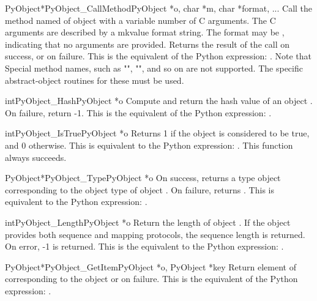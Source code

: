 \documentclass[twoside]{report}
\begin{document}
\begin{cfuncdesc}{PyObject*}{PyObject_CallMethod}{PyObject *o, char *m, char *format, ...}
Call the method named  of object  with a variable number of
C arguments.  The C arguments are described by a mkvalue
format string.  The format may be \NULL{}, indicating that no
arguments are provided. Returns the result of the call on
success, or \NULL{} on failure.  This is the equivalent of the
Python expression: .
Note that Special method names, such as "",
"", and so on are not supported. The specific
abstract-object routines for these must be used.
\end{cfuncdesc}


\begin{cfuncdesc}{int}{PyObject_Hash}{PyObject *o}
Compute and return the hash value of an object .  On
failure, return -1.  This is the equivalent of the Python
expression: .
\end{cfuncdesc}


\begin{cfuncdesc}{int}{PyObject_IsTrue}{PyObject *o}
Returns 1 if the object  is considered to be true, and
0 otherwise. This is equivalent to the Python expression:
.
This function always succeeds.
\end{cfuncdesc}


\begin{cfuncdesc}{PyObject*}{PyObject_Type}{PyObject *o}
On success, returns a type object corresponding to the object
type of object . On failure, returns \NULL{}.  This is
equivalent to the Python expression: .
\end{cfuncdesc}

\begin{cfuncdesc}{int}{PyObject_Length}{PyObject *o}
Return the length of object .  If the object  provides
both sequence and mapping protocols, the sequence length is
returned. On error, -1 is returned.  This is the equivalent
to the Python expression: .
\end{cfuncdesc}


\begin{cfuncdesc}{PyObject*}{PyObject_GetItem}{PyObject *o, PyObject *key}
Return element of  corresponding to the object  or \NULL{}
on failure. This is the equivalent of the Python expression:
.
\end{cfuncdesc}
\end{document}
